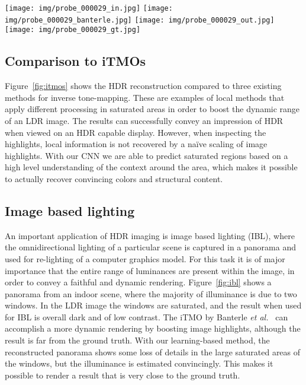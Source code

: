 \documentclass[acmtog]{acmart}
\newcommand{\figref}[1]{Figure~\ref{fig:#1}}
\newcommand{\etal}{\emph{et al.\ }}
\newcommand\belowfigspace{-2pt}
\newcommand\customsection[1]{\subsection{#1}}
\begin{document}
\begin{figure*}
	\vspace{5pt}
	\newcommand\ww{0.246}
	\centering
	\texttt{[image: img/probe\_000029\_in.jpg]}
	\texttt{[image: img/probe\_000029\_banterle.jpg]}
	\texttt{[image: img/probe\_000029\_out.jpg]}
	\texttt{[image: img/probe\_000029\_gt.jpg]}\\
	\vspace{-2pt}
	\vspace{-12pt}	
	\caption{\label{fig:ibl} IBL using reconstructed highlights. The top row shows the panoramas that are used for IBL in the bottom row. Rendering with the LDR input gives a dark and undynamic result. The iTMO boosts brightness to alleviate the problems. With our reconstruction, although all details cannot be recovered in the large saturated areas of the windows, the estimated luminance enables a visually convincing rendering that is much closer to the ground truth.}
	\vspace{\belowfigspace}
\end{figure*}

\customsection{Comparison to iTMOs}
\figref{itmos} shows the HDR reconstruction compared to three existing methods for inverse tone-mapping. These are examples of local methods that apply different processing in saturated areas in order to boost the dynamic range of an LDR image. The results can successfully convey an impression of HDR when viewed on an HDR capable display. However, when inspecting the highlights, local information is not recovered by a na\"ive scaling of image highlights. With our CNN we are able to predict saturated regions based on a high level understanding of the context around the area, which makes it possible to actually recover convincing colors and structural content.

\customsection{Image based lighting}
An important application of HDR imaging is image based lighting (IBL), where the omnidirectional lighting of a particular scene is captured in a panorama and used for re-lighting of a computer graphics model. For this task it is of major importance that the entire range of luminances are present within the image, in order to convey a faithful and dynamic rendering. \figref{ibl} shows a panorama from an indoor scene, where the majority of illuminance is due to two windows. In the LDR image the windows are saturated, and the result when used for IBL is overall dark and of low contrast. The iTMO by Banterle \etal \citeyear{Banterle2008} can accomplish a more dynamic rendering by boosting image highlights, although the result is far from the ground truth. With our learning-based method, the reconstructed panorama shows some loss of details in the large saturated areas of the windows, but the illuminance is estimated convincingly. This makes it possible to render a result that is very close to the ground truth.
 
\end{document}
